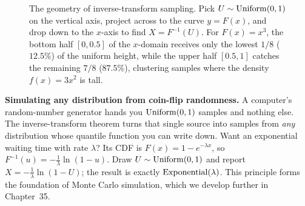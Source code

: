 \begin{figure}[H]
\centering
{}
\caption{The geometry of inverse-transform sampling. Pick $U \sim \operatorname{Uniform}(0,1)$ on the
vertical axis, project across to the curve $y = F(x)$, and drop down to the $x$-axis
to find $X = F^{-1}(U)$. For $F(x)=x^3$, the bottom half $[0, 0.5]$ of the $x$-domain
receives only the lowest $1/8$ ($12.5\%$) of the uniform height, while the upper half
$[0.5, 1]$ catches the remaining $7/8$ ($87.5\%$), clustering samples where the density
$f(x)=3x^2$ is tall.}
\label{ch10:fig-pit}
\end{figure}

\begin{applicationbox}
\textbf{Simulating any distribution from coin-flip randomness.} A computer's
random-number generator hands you $\operatorname{Uniform}(0,1)$ samples and nothing else. The
inverse-transform theorem turns that single source into samples from \emph{any}
distribution whose quantile function you can write down. Want an exponential waiting
time with rate $\lambda$? Its CDF is $F(x)=1-e^{-\lambda x}$, so
$F^{-1}(u) = -\tfrac{1}{\lambda}\ln(1-u)$. Draw $U\sim\operatorname{Uniform}(0,1)$ and report
$X = -\tfrac{1}{\lambda}\ln(1-U)$; the result is exactly $\operatorname{Exponential}(\lambda)$. This principle
forms the foundation of Monte Carlo simulation, which we develop further in
Chapter~35.
\end{applicationbox}

